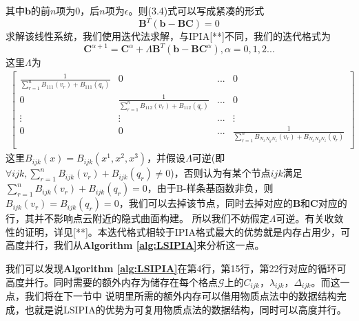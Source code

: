 其中$\mathbf{b}$的前$n$项为$0$，后$n$项为$\epsilon$。则(3.4)式可以写成紧凑的形式
\begin{equation}
    \mathbf{B}^T ( \mathbf{b} - \mathbf{B} \mathbf{C}) = 0    
\end{equation}
求解该线性系统，我们使用迭代法求解，与IPIA[**]不同，我们的迭代格式为
\begin{equation}
\mathbf{C}^{\alpha + 1} = \mathbf{C}^{\alpha} + \Lambda \mathbf{B}^T(\mathbf{b} - \mathbf{B}\mathbf{C}^{\alpha}) , \alpha = 0,1,2...
\end{equation}
这里$\Lambda$为
\begin{equation}
    \begin{split}
        \begin{bmatrix}
            \frac{1}{\sum_{r = 1}^n B_{111}(v_r) +B_{111}(q_r)} & 0 & ... & 0\\
            0 & \frac{1}{\sum_{r = 1}^n B_{112}(v_r) +B_{112}(q_r)} & ... & 0\\
            \vdots & \vdots & ... & \vdots \\
            0 & 0 & ... & \frac{1}{\sum_{r = 1}^n B_{N_xN_yN_z}(v_r) +B_{N_xN_yN_z}(q_r)} \\
        \end{bmatrix}
    \end{split}
\end{equation}
这里$B_{ijk}(x) = B_{ijk}(x^1,x^2,x^3)$，并假设$\Lambda$可逆(即$\forall ijk ,\sum_{r = 1}^n B_{ijk}(v_r) +B_{ijk}(q_r) \neq 0$)，否则认为有某个节点$ijk$满足$\sum_{r = 1}^n B_{ijk}(v_r) +B_{ijk}(q_r) = 0$，由于B-样条基函数非负，则$B_{ijk}(v_r) = B_{ijk}(q_r) = 0$，我们可以去掉该节点，同时去掉对应的$\mathbf{B}$和$\mathbf{C}$对应的行，其并不影响点云附近的隐式曲面构建。
所以我们不妨假定$\Lambda$可逆。有关收敛性的证明，详见[**]。本迭代格式相较于IPIA格式最大的优势就是内存占用少，可高度并行，我们从\textbf{Algorithm \ref{alg:LSIPIA}}来分析这一点。

我们可以发现\textbf{Algorithm \ref{alg:LSIPIA}}在第4行，第15行，第22行对应的循环可高度并行。同时需要的额外内存为储存在每个格点$\mathcal{G}$上的$C_{ijk}$，$\lambda_{ijk}$，$\Delta_{ijk}$。而这一点，我们将在下一节中
说明里所需的额外内存可以借用物质点法中的数据结构完成，也就是说LSIPIA的优势为可复用物质点法的数据结构，同时可以高度并行。

